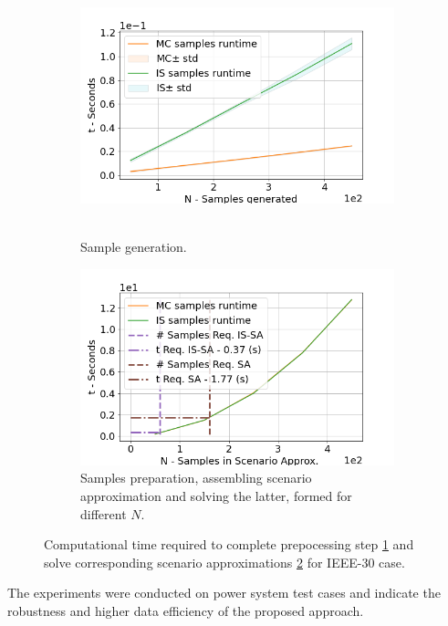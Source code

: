 \begin{figure}[hbt]
\centering
\begin{subfigure}{.8\textwidth}
  \centering
  \includegraphics[width=0.9\linewidth]{Dissertation/images/dc_stochastic_approx/profiling_samplig.png}~~~~~~\hfill
  \caption{Sample generation.}
  \label{fig:profile_generate_samples}
\end{subfigure}
\begin{subfigure}{.8\textwidth}
  \centering
  \hspace{-10mm}\includegraphics[width=0.9\linewidth]{Dissertation/images/dc_stochastic_approx/profiling_approx_sol.png}
  \caption{Samples preparation, assembling scenario approximation and solving the latter, formed for different $N$.}
  \label{fig:profile_scenario_approx}
\end{subfigure}
\caption{Computational time required to complete prepocessing step \ref{fig:profile_generate_samples} and solve corresponding scenario approximations \ref{fig:profile_scenario_approx} for IEEE-30 case. }
\label{fig:profiling}
\end{figure}
The experiments were conducted on power system test cases and indicate the robustness and higher data efficiency of the proposed approach.

